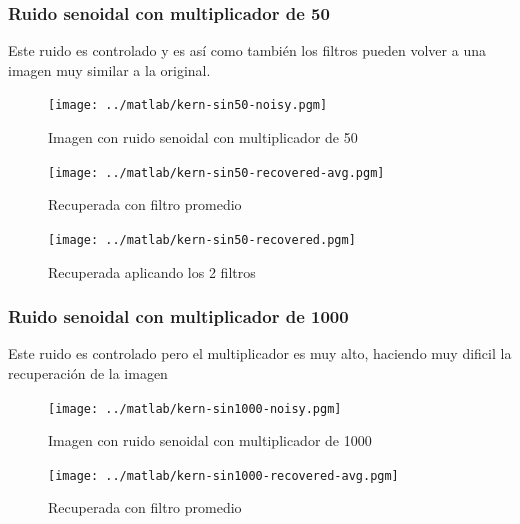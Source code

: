 \subsubsection{Ruido senoidal con multiplicador de 50}

Este ruido es controlado y es as\'i como tambi\'en los filtros pueden volver a
una imagen muy similar a la original.

\begin{figure}[H]
\begin {center}
\texttt{[image: ../matlab/kern-sin50-noisy.pgm]}
\end {center}
\caption{Imagen con ruido senoidal con multiplicador de 50}
\label{fig:SinProm}
\end{figure}

\begin{figure}[H]
\begin {center}
\texttt{[image: ../matlab/kern-sin50-recovered-avg.pgm]}
\end {center}
\caption{Recuperada con filtro promedio}
\label{fig:SinProm}
\end{figure}

\begin{figure}[H]
\begin {center}
\texttt{[image: ../matlab/kern-sin50-recovered.pgm]}
\end {center}
\caption{Recuperada aplicando los 2 filtros}
\label{fig:SinProm}
\end{figure}

\subsubsection{Ruido senoidal con multiplicador de 1000}

Este ruido es controlado pero el multiplicador es muy alto, haciendo muy dificil
la recuperaci\'on de la imagen

\begin{figure}[H]
\begin {center}
\texttt{[image: ../matlab/kern-sin1000-noisy.pgm]}
\end {center}
\caption{Imagen con ruido senoidal con multiplicador de 1000}
\label{fig:SinProm}
\end{figure}

\begin{figure}[H]
\begin {center}
\texttt{[image: ../matlab/kern-sin1000-recovered-avg.pgm]}
\end {center}
\caption{Recuperada con filtro promedio}
\label{fig:SinProm}
\end{figure}


